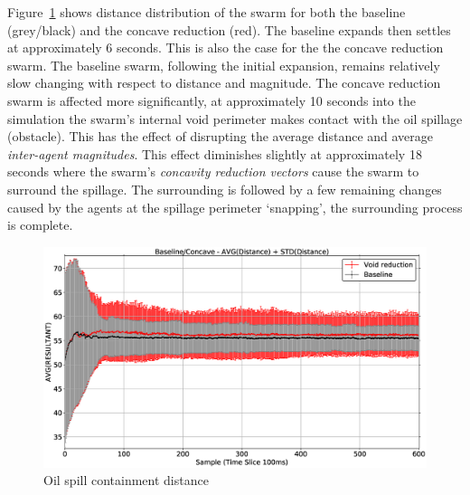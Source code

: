 Figure~\ref{concave:OilSpillPerimeter8060-DIST-1} shows distance distribution of the swarm for both the baseline (grey/black) and the concave reduction (red). The baseline expands then settles at approximately 6 seconds. This is also the case for the the concave reduction swarm. The baseline swarm, following the initial expansion, remains relatively slow changing with respect to distance and magnitude. The concave reduction swarm is affected more significantly, at approximately 10 seconds into the simulation the swarm's internal void perimeter makes contact with the oil spillage (obstacle). This has the effect of disrupting the average distance and average \textit{inter-agent magnitudes}. This effect diminishes slightly at approximately 18 seconds where the swarm's \textit{concavity reduction vectors} cause the swarm to surround the spillage. The surrounding is followed by a few remaining changes caused by the agents at the spillage perimeter `snapping', the surrounding process is complete.
\begin{figure}[H]
\begin{center}
\includegraphics[width=14cm]{CHAPTER-7/figures/OilSpillPerimeter8060-DIST-1}
\end{center}
\caption{Oil spill containment distance\label{concave:OilSpillPerimeter8060-DIST-1}}
\end{figure}

